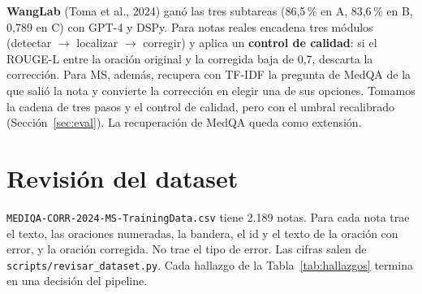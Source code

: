 \documentclass[11pt,a4paper]{article}
\begin{document}
\textbf{WangLab} (Toma et al., 2024) ganó las tres subtareas (86,5\,\% en A, 83,6\,\% en B, 0,789 en C) con
GPT-4 y DSPy. Para notas reales encadena tres módulos (detectar $\rightarrow$ localizar $\rightarrow$ corregir)
y aplica un \textbf{control de calidad}: si el ROUGE-L entre la oración original y la corregida baja de 0,7,
descarta la corrección. Para MS, además, recupera con TF-IDF la pregunta de MedQA de la que salió la nota y
convierte la corrección en elegir una de sus opciones. Tomamos la cadena de tres pasos y el control de calidad, pero con el umbral recalibrado (Sección~\ref{sec:eval}).
La recuperación de MedQA queda como extensión.

\section{Revisión del dataset}

\texttt{MEDIQA-CORR-2024-MS-TrainingData.csv} tiene 2.189 notas. Para cada nota trae el texto, las oraciones
numeradas, la bandera, el id y el texto de la oración con error, y la oración corregida. No trae el tipo de error.
Las cifras salen de \texttt{scripts/revisar\_dataset.py}. Cada hallazgo de la Tabla~\ref{tab:hallazgos} termina
en una decisión del pipeline.
\end{document}
